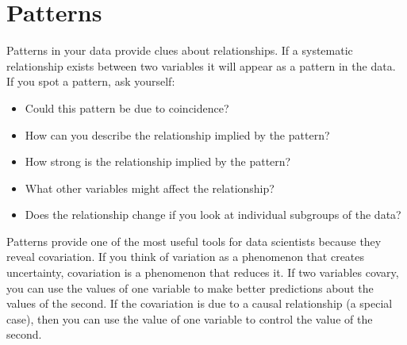 \documentclass{article}
\begin{document}
\section{Patterns}

Patterns in your data provide clues about relationships. If a systematic relationship exists between two variables it will appear as a pattern in the data. If you spot a pattern, ask yourself:

\begin{itemize}
    \item Could this pattern be due to coincidence?
    \item How can you describe the relationship implied by the pattern?
    \item How strong is the relationship implied by the pattern?
    \item What other variables might affect the relationship?
    \item Does the relationship change if you look at individual subgroups of the data?
\end{itemize}

Patterns provide one of the most useful tools for data scientists because they reveal covariation. If you think of variation as a phenomenon that creates uncertainty, covariation is a phenomenon that reduces it. If two variables covary, you can use the values of one variable to make better predictions about the values of the second. If the covariation is due to a causal relationship (a special case), then you can use the value of one variable to control the value of the second.
\end{document}
